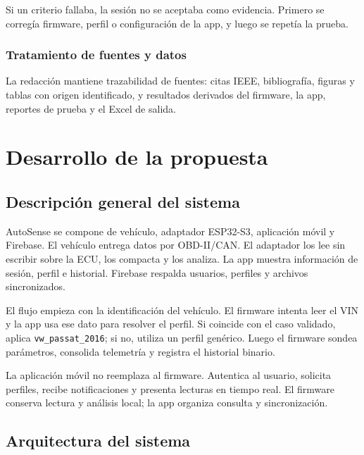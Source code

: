 \documentclass[12pt,letterpaper]{report}
\begin{document}
Si un criterio fallaba, la sesión no se aceptaba como evidencia. Primero se corregía firmware, perfil o configuración de la app, y luego se repetía la prueba.

\subsection*{Tratamiento de fuentes y datos}

La redacción mantiene trazabilidad de fuentes: citas IEEE, bibliografía, figuras y tablas con origen identificado, y resultados derivados del firmware, la app, reportes de prueba y el Excel de salida.

\chapter{Desarrollo de la propuesta}

\section{Descripción general del sistema}

\label{sec:descripcion-general-sistema}

AutoSense se compone de vehículo, adaptador ESP32-S3, aplicación móvil y Firebase. El vehículo entrega datos por OBD-II/CAN. El adaptador los lee sin escribir sobre la ECU, los compacta y los analiza. La app muestra información de sesión, perfil e historial. Firebase respalda usuarios, perfiles y archivos sincronizados.

El flujo empieza con la identificación del vehículo. El firmware intenta leer el VIN y la app usa ese dato para resolver el perfil. Si coincide con el caso validado, aplica \texttt{vw\_passat\_2016}; si no, utiliza un perfil genérico. Luego el firmware sondea parámetros, consolida telemetría y registra el historial binario.

La aplicación móvil no reemplaza al firmware. Autentica al usuario, solicita perfiles, recibe notificaciones y presenta lecturas en tiempo real. El firmware conserva lectura y análisis local; la app organiza consulta y sincronización.

\section{Arquitectura del sistema}

\label{sec:arquitectura-sistema}
\end{document}
